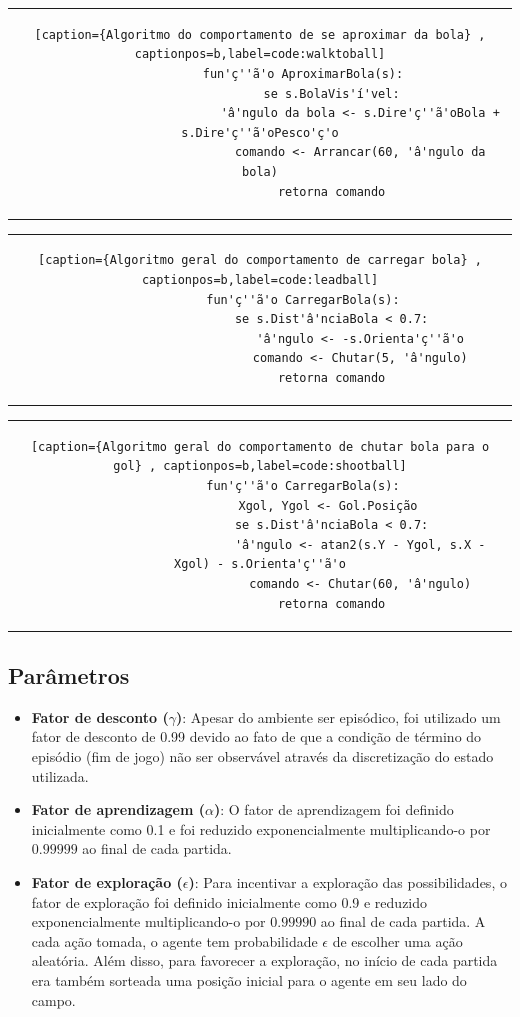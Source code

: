 	\begin{tabular}{c}
		\begin{lstlisting}[caption={Algoritmo do comportamento de se aproximar da bola} , captionpos=b,label=code:walktoball]
			fun'ç''ã'o AproximarBola(s):
					se s.BolaVis'í'vel:
							'â'ngulo da bola <- s.Dire'ç''ã'oBola + s.Dire'ç''ã'oPesco'ç'o
							comando <- Arrancar(60, 'â'ngulo da bola)
					retorna comando
		\end{lstlisting}
	\end{tabular}

	\begin{tabular}{c}
		\begin{lstlisting}[caption={Algoritmo geral do comportamento de carregar bola} , captionpos=b,label=code:leadball]
			fun'ç''ã'o CarregarBola(s):
					se s.Dist'â'nciaBola < 0.7:
							'â'ngulo <- -s.Orienta'ç''ã'o
							comando <- Chutar(5, 'â'ngulo)
					retorna comando
		\end{lstlisting}
	\end{tabular}
	
	\begin{tabular}{c}
		\begin{lstlisting}[caption={Algoritmo geral do comportamento de chutar bola para o gol} , captionpos=b,label=code:shootball]
			fun'ç''ã'o CarregarBola(s):
					Xgol, Ygol <- Gol.Posição 
					se s.Dist'â'nciaBola < 0.7:
							'â'ngulo <- atan2(s.Y - Ygol, s.X - Xgol) - s.Orienta'ç''ã'o
							comando <- Chutar(60, 'â'ngulo)
					retorna comando
		\end{lstlisting}
	\end{tabular}



\subsection{Parâmetros}
\label{subsubsec:sarsa-params}

\begin{itemize}
	\item \textbf{Fator de desconto ($\gamma$)}: Apesar do ambiente ser episódico, foi utilizado um fator de desconto de 0.99 devido ao fato de que a condição de término do episódio (fim de jogo) não ser observável através da discretização do estado utilizada.  
	
	\item \textbf{Fator de aprendizagem ($\alpha$)}: O fator de aprendizagem foi definido inicialmente como 0.1 e foi reduzido exponencialmente multiplicando-o por $0.99999$ ao final de cada partida. 
	
	\item \textbf{Fator de exploração ($\epsilon$)}: Para incentivar a exploração das possibilidades, o fator de exploração foi definido inicialmente como 0.9 e reduzido exponencialmente multiplicando-o por $0.99990$ ao final de cada partida. A cada ação tomada, o agente tem probabilidade $\epsilon$ de escolher uma ação aleatória. Além disso, para favorecer a exploração, no início de cada partida era também sorteada uma posição inicial para o agente em seu lado do campo.
\end{itemize}

